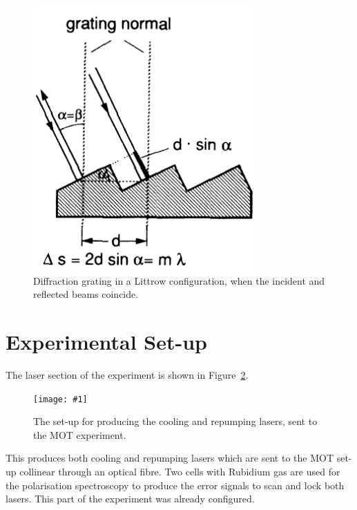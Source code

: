 \documentclass[twocolumn]{article}
\newcommand{\insertFigure}[1]{%
   \texttt{[image: \#1]}%
}
\begin{document}
\begin{figure}
	\centering
	\includegraphics[scale=0.4]{Images/Grating.png}
	\caption{Diffraction grating in a Littrow configuration, when the incident and reflected beams coincide.~\cite{demtroder}}
	\label{fig:Grating}
\end{figure}


\section{Experimental Set-up} \label{sec:Exp}
The laser section of the experiment is shown in Figure~\ref{fig:Laser}.
\begin{figure} [!h]
	\centering
	\insertFigure{Images/Laser.png}
	\caption{The set-up for producing the cooling and repumping lasers, sent to the MOT experiment.~\cite{manual}}
	\label{fig:Laser}
\end{figure}
This produces both cooling and repumping lasers which are sent to the MOT set-up collinear through an optical fibre. Two cells with Rubidium gas are used for the polarisation spectroscopy to produce the error signals to scan and lock both lasers. This part of the experiment was already configured.
\end{document}
